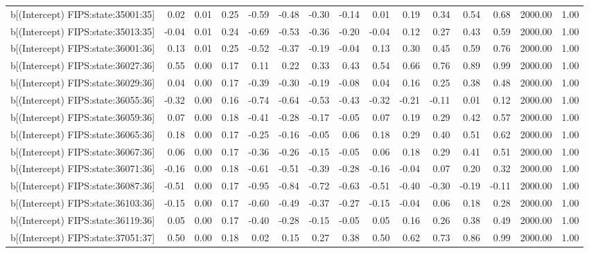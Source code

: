 \begin{table}[ht]
\begin{tabular}{rrrrrrrrrrrrrrr}
  b[(Intercept) FIPS:state:35001:35] & 0.02 & 0.01 & 0.25 & -0.59 & -0.48 & -0.30 & -0.14 & 0.01 & 0.19 & 0.34 & 0.54 & 0.68 & 2000.00 & 1.00 \\ 
  b[(Intercept) FIPS:state:35013:35] & -0.04 & 0.01 & 0.24 & -0.69 & -0.53 & -0.36 & -0.20 & -0.04 & 0.12 & 0.27 & 0.43 & 0.59 & 2000.00 & 1.00 \\ 
  b[(Intercept) FIPS:state:36001:36] & 0.13 & 0.01 & 0.25 & -0.52 & -0.37 & -0.19 & -0.04 & 0.13 & 0.30 & 0.45 & 0.59 & 0.76 & 2000.00 & 1.00 \\ 
  b[(Intercept) FIPS:state:36027:36] & 0.55 & 0.00 & 0.17 & 0.11 & 0.22 & 0.33 & 0.43 & 0.54 & 0.66 & 0.76 & 0.89 & 0.99 & 2000.00 & 1.00 \\ 
  b[(Intercept) FIPS:state:36029:36] & 0.04 & 0.00 & 0.17 & -0.39 & -0.30 & -0.19 & -0.08 & 0.04 & 0.16 & 0.25 & 0.38 & 0.48 & 2000.00 & 1.00 \\ 
  b[(Intercept) FIPS:state:36055:36] & -0.32 & 0.00 & 0.16 & -0.74 & -0.64 & -0.53 & -0.43 & -0.32 & -0.21 & -0.11 & 0.01 & 0.12 & 2000.00 & 1.00 \\ 
  b[(Intercept) FIPS:state:36059:36] & 0.07 & 0.00 & 0.18 & -0.41 & -0.28 & -0.17 & -0.05 & 0.07 & 0.19 & 0.29 & 0.42 & 0.57 & 2000.00 & 1.00 \\ 
  b[(Intercept) FIPS:state:36065:36] & 0.18 & 0.00 & 0.17 & -0.25 & -0.16 & -0.05 & 0.06 & 0.18 & 0.29 & 0.40 & 0.51 & 0.62 & 2000.00 & 1.00 \\ 
  b[(Intercept) FIPS:state:36067:36] & 0.06 & 0.00 & 0.17 & -0.36 & -0.26 & -0.15 & -0.05 & 0.06 & 0.18 & 0.29 & 0.41 & 0.51 & 2000.00 & 1.00 \\ 
  b[(Intercept) FIPS:state:36071:36] & -0.16 & 0.00 & 0.18 & -0.61 & -0.51 & -0.39 & -0.28 & -0.16 & -0.04 & 0.07 & 0.20 & 0.32 & 2000.00 & 1.00 \\ 
  b[(Intercept) FIPS:state:36087:36] & -0.51 & 0.00 & 0.17 & -0.95 & -0.84 & -0.72 & -0.63 & -0.51 & -0.40 & -0.30 & -0.19 & -0.11 & 2000.00 & 1.00 \\ 
  b[(Intercept) FIPS:state:36103:36] & -0.15 & 0.00 & 0.17 & -0.60 & -0.49 & -0.37 & -0.27 & -0.15 & -0.04 & 0.06 & 0.18 & 0.28 & 2000.00 & 1.00 \\ 
  b[(Intercept) FIPS:state:36119:36] & 0.05 & 0.00 & 0.17 & -0.40 & -0.28 & -0.15 & -0.05 & 0.05 & 0.16 & 0.26 & 0.38 & 0.49 & 2000.00 & 1.00 \\ 
  b[(Intercept) FIPS:state:37051:37] & 0.50 & 0.00 & 0.18 & 0.02 & 0.15 & 0.27 & 0.38 & 0.50 & 0.62 & 0.73 & 0.86 & 0.99 & 2000.00 & 1.00 \\ 

\end{tabular}
\end{table}
